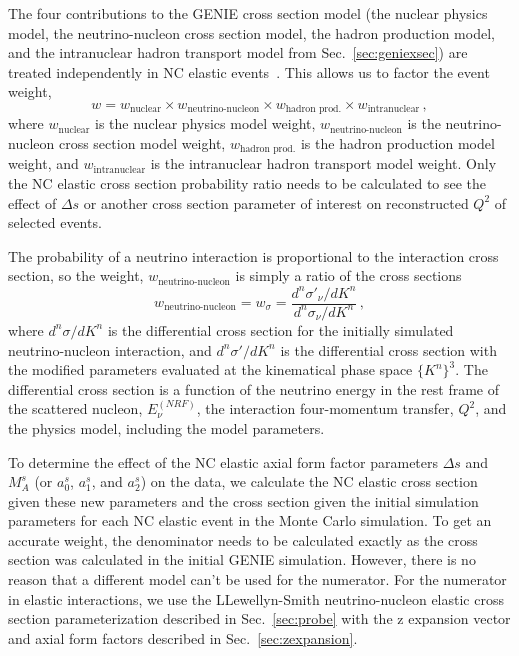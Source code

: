     The four contributions to the GENIE cross section model (the nuclear
    physics model, the neutrino-nucleon cross section model, the hadron
    production model, and the intranuclear hadron transport model from
    Sec.~\ref{sec:geniexsec}) are treated independently in NC elastic
    events~\cite{Andreopoulos:2009rq}. This allows us to factor the event
    weight,
    \begin{equation}\label{eq:weights}
      w = w_{\textrm{nuclear}}\times w_{\textrm{neutrino-nucleon}}\times 
          w_{\textrm{hadron prod.}}\times w_{\textrm{intranuclear}} \,,
    \end{equation}
    where $w_{\textrm{nuclear}}$ is the nuclear physics model weight,
    $w_{\textrm{neutrino-nucleon}}$ is the neutrino-nucleon cross section model
    weight, $w_{\textrm{hadron prod.}}$ is the hadron production model weight,
    and $w_{\textrm{intranuclear}}$ is the intranuclear hadron transport model
    weight. Only the NC elastic cross section probability ratio needs to be
    calculated to see the effect of $\Delta s$ or another cross section
    parameter of interest on reconstructed $Q^2$ of selected events.

    The probability of a neutrino interaction is proportional to the
    interaction cross section, so the weight, $w_{\textrm{neutrino-nucleon}}$
    is simply a ratio of the cross sections
    \begin{equation}
      w_{\textrm{neutrino-nucleon}} = w_{\sigma} 
        = \frac{d^n\sigma'_{\nu}/dK^n}{d^n\sigma_{\nu}/dK^n} \,,
    \end{equation}
    where $d^n\sigma/dK^n$ is the differential cross section for the initially
    simulated neutrino-nucleon interaction, and $d^n\sigma'/dK^n$ is the
    differential cross section with the modified parameters evaluated at the
    kinematical phase space $\{K^n\}^3$. The differential cross section is a
    function of the neutrino energy in the rest frame of the scattered nucleon,
    $E_{\nu}^{(NRF)}$, the interaction four-momentum transfer, $Q^2$, and the
    physics model, including the model parameters.

    To determine the effect of the NC elastic axial form factor parameters
    $\Delta s$ and $M_A^s$ (or $a_0^s$, $a_1^s$, and $a_2^s$) on the data, we
    calculate the NC elastic cross section given these new parameters and the
    cross section given the initial simulation parameters for each NC elastic
    event in the Monte Carlo simulation. To get an accurate weight, the
    denominator needs to be calculated exactly as the cross section was
    calculated in the initial GENIE simulation. However, there is no reason
    that a different model can't be used for the numerator. For the numerator
    in elastic interactions, we use the LLewellyn-Smith neutrino-nucleon
    elastic cross section parameterization described in Sec.~\ref{sec:probe}
    with the z expansion vector and axial form factors described in
    Sec.~\ref{sec:zexpansion}.

